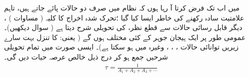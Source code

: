 میں اب تک فرض کرتا آ  رہا ہوں کہ نظام میں صرف دو حالات پائے جاتے ہیں،   تاہم  علامتیت سادہ رکھنے کی خاطر  ایسا کیا گیا ؛تحرک شدہ اخراج کا کلیہ ( مساوات ) ،  دیگر قابل رسائی حالات   سے قطع نظر،    کی  تحویلی شرح دیتا ہے ( سوال   دیکھیں)۔ عمومی طور پر ایک ہیجان جوہر کے کئی مختلف   ہوں گے ( یعنی:   کا تنزل بہت سارے  زیریں توانائی حالات
 ، ، ، وغیرہ  میں ہو سکتا ہے)۔ ایسی صورت میں تمام تحویلی شرحیں   جمع ہو کر درج ذیل  خالص عرصہ حیات دیں گی۔
\begin{align}
	\tau = \frac{1}{A_1+A_2+A_3+\dotsb}
\end{align}


